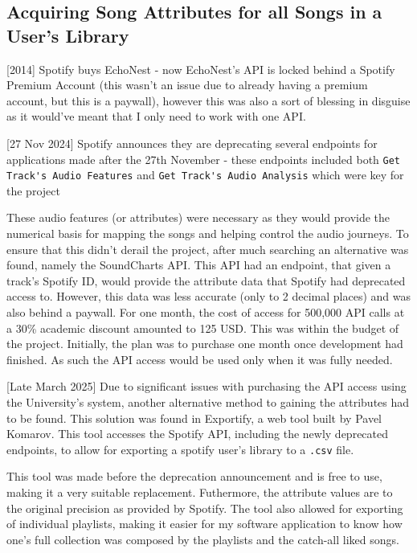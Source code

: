 \subsection{Acquiring Song Attributes for all Songs in a User's Library}
[2014] Spotify buys EchoNest - now EchoNest's API is locked behind a Spotify Premium Account (this wasn't an issue due to already having a premium account, but this is a paywall), however this was also a sort of blessing in disguise as it would've meant that I only need to work with one API.
    
[27 Nov 2024] Spotify announces they are deprecating several endpoints for applications made after the 27th November - these endpoints included both \lstinline|Get Track's Audio Features| and \lstinline|Get Track's Audio Analysis| which were key for the project

These audio features (or attributes) were necessary as they would provide the numerical basis for mapping the songs and helping control the audio journeys.
To ensure that this didn't derail the project, after much searching an alternative was found, namely the SoundCharts API. This API had an endpoint, that given a track's Spotify ID, would provide the attribute data that Spotify had deprecated access to.
However, this data was less accurate (only to 2 decimal places) and was also behind a paywall. For one month, the cost of access for 500,000 API calls at a 30\% academic discount amounted to 125 USD. This was within the budget of the project. Initially, the plan was to purchase one month once development had finished. As such the API access would be used only when it was fully needed.

[Late March 2025] Due to significant issues with purchasing the API access using the University's system, another alternative method to gaining the attributes had to be found. This solution was found in Exportify, a web tool built by Pavel Komarov. This tool accesses the Spotify API, including the newly deprecated endpoints, to allow for exporting a spotify user's library to a \lstinline|.csv| file.

This tool was made before the deprecation announcement and is free to use, making it a very suitable replacement. Futhermore, the attribute values are to the original precision as provided by Spotify. The tool also allowed for exporting of individual playlists, making it easier for my software application to know how one's full collection was composed by the playlists and the catch-all liked songs.

